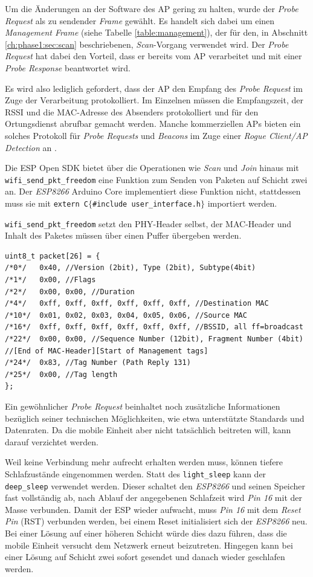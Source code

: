 Um die Änderungen an der Software des AP gering zu halten, wurde der \emph{Probe Request} als zu sendender \emph{Frame} gewählt.
Es handelt sich dabei um einen \emph{Management Frame} (siehe Tabelle \ref{table:management}), der für den, in Abschnitt \ref{ch:phase1:sec:scan} beschriebenen, \emph{Scan}-Vorgang verwendet wird.
Der \emph{Probe Request} hat dabei den Vorteil, dass er bereits vom AP verarbeitet und mit einer \emph{Probe Response} beantwortet wird. 

Es wird also lediglich gefordert, dass der AP den Empfang des \emph{Probe Request} im Zuge der Verarbeitung protokolliert. 
Im Einzelnen müssen die Empfangszeit, der RSSI und die MAC-Adresse des Absenders protokolliert und für den Ortungsdienst abrufbar gemacht werden. 
Manche kommerziellen APs bieten ein solches Protokoll für \emph{Probe Requests} und \emph{Beacons} im Zuge einer \textit{Rogue Client/AP Detection} an \cite{lancom2017rouge}.

Die ESP Open SDK bietet über die Operationen wie \emph{Scan} und \emph{Join} hinaus mit \texttt{wifi\_send\_pkt\_freedom} eine Funktion zum Senden von Paketen auf Schicht zwei an.
Der \emph{ESP8266} Arduino Core implementiert diese Funktion nicht, stattdessen muss sie mit \texttt{extern \dq C\dq $\lbrace$\#include \dq user\_interface.h\dq $\rbrace$} importiert werden. 

\texttt{wifi\_send\_pkt\_freedom} setzt den PHY-Header selbst, der MAC-Header und Inhalt des Paketes müssen über einen Puffer übergeben werden.
\begin{verbatim}
uint8_t packet[26] = { 
/*0*/ 	0x40, //Version (2bit), Type (2bit), Subtype(4bit)
/*1*/ 	0x00, //Flags 
/*2*/ 	0x00, 0x00, //Duration
/*4*/   0xff, 0xff, 0xff, 0xff, 0xff, 0xff, //Destination MAC
/*10*/  0x01, 0x02, 0x03, 0x04, 0x05, 0x06, //Source MAC
/*16*/  0xff, 0xff, 0xff, 0xff, 0xff, 0xff, //BSSID, all ff=broadcast
/*22*/  0x00, 0x00, //Sequence Number (12bit), Fragment Number (4bit) 
//[End of MAC-Header][Start of Management tags]
/*24*/  0x83, //Tag Number (Path Reply 131) 
/*25*/ 	0x00, //Tag length
}; 
\end{verbatim}
Ein gewöhnlicher \emph{Probe Request} beinhaltet noch zusätzliche Informationen bezüglich seiner technischen Möglichkeiten, wie etwa unterstützte Standards und Datenraten. 
Da die mobile Einheit aber nicht tatsächlich beitreten will, kann darauf verzichtet werden. 

Weil keine Verbindung mehr aufrecht erhalten werden muss, können tiefere Schlafzustände eingenommen werden. 
Statt des \texttt{light\_sleep} kann der \texttt{deep\_sleep} verwendet werden.
Dieser schaltet den \emph{ESP8266} und seinen Speicher fast vollständig ab, nach Ablauf der angegebenen Schlafzeit wird \emph{Pin 16} mit der Masse verbunden.
Damit der ESP wieder aufwacht, muss \emph{Pin 16} mit dem \emph{Reset Pin} (RST) verbunden werden, bei einem Reset initialisiert sich der \emph{ESP8266} neu.
Bei einer Lösung auf einer höheren Schicht würde dies dazu führen, dass die mobile Einheit versucht dem Netzwerk erneut beizutreten. 
Hingegen kann bei einer Lösung auf Schicht zwei sofort gesendet und danach wieder geschlafen werden.

